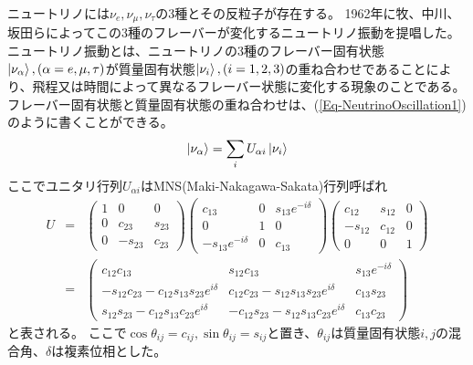 \documentclass[a4paper,10pt]{jreport}
\begin{document}
ニュートリノには$\nu_e,\nu_{\mu},\nu_{\tau}$の3種とその反粒子が存在する。
1962年に牧、中川、坂田らによってこの3種のフレーバーが変化するニュートリノ振動を提唱した。
ニュートリノ振動とは、ニュートリノの3種のフレーバー固有状態$\ket{\nu_{\alpha}},(\alpha=e,\mu,\tau)$が質量固有状態$\ket{\nu_i},(i=1,2,3)$の重ね合わせであることにより、飛程又は時間によって異なるフレーバー状態に変化する現象のことである。
フレーバー固有状態と質量固有状態の重ね合わせは、(\ref{Eq-NeutrinoOscillation1})のように書くことができる。
\begin{equation} \label{Eq-NeutrinoOscillation1}
	\ket{\nu_{\alpha}}=\sum_i U_{\alpha i}\ket{\nu_i}
\end{equation}
ここでユニタリ行列$U_{\alpha i}$はMNS(Maki-Nakagawa-Sakata)行列呼ばれ
\begin{eqnarray} \label{Eq-Unitary}
U 
&=&
\left(
	\begin{array}{ccc}
		1 & 0 & 0 \\
		0 & c_{23} & s_{23} \\
		0 & -s_{23} & c_{23}
	\end{array}
\right)
\left(
	\begin{array}{ccc}
		c_{13} & 0 & s_{13}e^{-i\delta} \\
		0 & 1 & 0 \\
		-s_{13}e^{-i\delta} & 0 & c_{13}
	\end{array}
\right)
\left(
	\begin{array}{ccc}
		c_{12} & s_{12} & 0 \\
		-s_{12} & c_{12} & 0 \\
		0 & 0 & 1
	\end{array}
\right) \nonumber \\ 
&=&
\left(
	\begin{array}{ccc}
		c_{12}c_{13} & s_{12}c_{13} & s_{13}e^{-i\delta} \\
		-s_{12}c_{23}-c_{12}s_{13}s_{23}e^{i\delta} & c_{12}c_{23}-s_{12}s_{13}s_{23}e^{i\delta} & c_{13}s_{23} \\
		s_{12}s_{23}-c_{12}s_{13}c_{23}e^{i\delta} & -c_{12}s_{23}-s_{12}s_{13}c_{23}e^{i\delta} & c_{13}c_{23}
	\end{array}
\right)
\end{eqnarray}
と表される。
ここで$\cos\theta_{ij}=c_{ij},\sin\theta_{ij}=s_{ij}$と置き、$\theta_{ij}$は質量固有状態$i,j$の混合角、$\delta$は複素位相とした。
\end{document}
